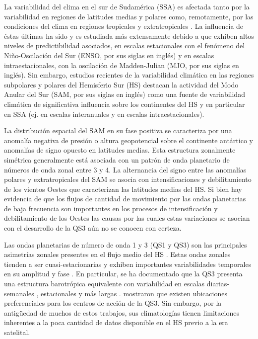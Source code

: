 \documentclass[spanish,a4paper,12pt,oneside]{book}
\begin{document}
La variabilidad del clima en el sur de Sudamérica (SSA) es afectada
tanto por la variabilidad en regiones de latitudes medias y polares
como, remotamente, por las condiciones del clima en regiones tropicales
y extratropicales \citep[ej.][]{Vera2006}. La influencia de éstas
últimas ha sido y es estudiada más extensamente debido a que exhiben
altos niveles de predictibilidad asociados, en escalas estacionales con
el fenómeno del Niño-Oscilación del Sur (ENSO, por sus siglas en inglés)
y en escalas intraestacionales, con la oscilación de Madden-Julian (MJO,
por sus siglas en inglés). Sin embargo, estudios recientes de la
variabilidad climática en las regiones subpolares y polares del
Hemisferio Sur (HS) destacan la actividad del Modo Anular del Sur (SAM,
por sus siglas en inglés) como una fuente de variabilidad climática de
significativa influencia sobre los continentes del HS y en particular en
SSA (ej. \citet{Silvestri2009} en escalas interanuales y
\citet{Alvarez2014} en escalas intraestacionales).

La distribución espacial del SAM en su fase positiva se caracteriza por
una anomalía negativa de presión o altura geopotencial sobre el
continente antártico y anomalías de signo opuesto en latitudes medias.
Esta estructura zonalmente simétrica generalmente está asociada con un
patrón de onda planetario de números de onda zonal entre 3 y 4. La
alternancia del signo entre las anomalías polares y extratropicales del
SAM se asocia con intensificaciones y debilitamiento de los vientos
Oestes que caracterizan las latitudes medias del HS. Si bien hay
evidencia de que los flujos de cantidad de movimiento por las ondas
planetarias de baja frecuencia son importantes en los procesos de
intensificación y debilitamiento de los Oestes
\citep{Lorenz2001, Simpson2013} las causas por las cuales estas
variaciones se asocian con el desarrollo de la QS3 aún no se conocen con
certeza.

Las ondas planetarias de número de onda 1 y 3 (QS1 y QS3) son las
principales asimetrías zonales presentes en el flujo medio del HS
\citep{Loon1972, Trenberth1980a}. Estas ondas zonales tienden a ser
cuasi-estacionarias y exhiben importantes variabilidades temporales en
su amplitud y fase \citep{Loon1972}. En particular, se ha documentado
que la QS3 presenta una estructura barotrópica equivalente con
variabilidad en escalas diarias-semanales \citep{Kidson1988},
estacionales \citep{Mo1985} y más largas \citep{Karoly1989}.
\citet{Mo1985} mostraron que existen ubicaciones preferenciales para los
centros de acción de la QS3. Sin embargo, por la antigüedad de muchos de
estos trabajos, sus climatologías tienen limitaciones inherentes a la
poca cantidad de datos disponible en el HS previo a la era satelital.
\end{document}
